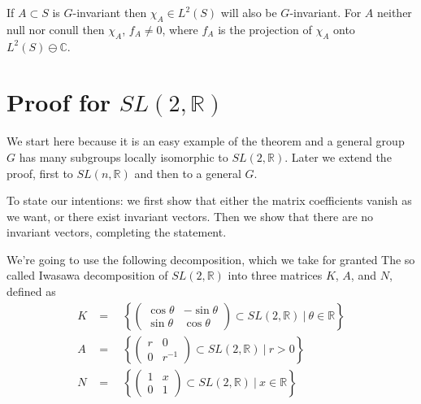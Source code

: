 \documentclass[
  12pt
]{article}
\theoremstyle{break}
\theoremstyle{plain}
\begin{document}
  If $A\subset S$ is $G$-invariant then $\chi_A\in L^2(S)$ will also
  be $G$-invariant. 
  For $A$ neither null nor conull then
  $\chi_A$, $f_A \neq 0$, where $f_A$ is the projection of
  $\chi_A$ onto $L^2(S) \ominus \mathbb{C}$.




\hypertarget{proof-for-sl2r}{%
\section{Proof for \texorpdfstring{$SL(2, \mathbb{R})$}{SL(2, R)}}\label{proof-for-sl2r}}


  We start here because it is an easy example of the theorem and a general
  group $G$ has many subgroups locally isomorphic to
  $SL(2, \mathbb{R})$. Later we extend the proof, first to
  $SL(n, \mathbb{R})$ and then to a general $G$.

  To state our intentions: we first show that either the matrix
  coefficients vanish as we want, or there exist invariant vectors. Then
  we show that there are no invariant vectors, completing the statement.

  We're going to use the following decomposition, which we take for
  granted 
  The so called Iwasawa decomposition of $SL(2, \mathbb{R})$ into three
  matrices $K$, $A$, and $N$, defined as
  \begin{align}
  K & =\quad \left\{ \begin{pmatrix} \cos\theta & -\sin\theta \\ \sin\theta & \cos\theta\end{pmatrix} \subset SL(2, \mathbb{R})  \ | \ \theta \in \mathbb{R} \right\} \\
  A & =\quad \left\{ \begin{pmatrix} r & 0 \\ 0 & r^{-1} \end{pmatrix} \subset SL(2, \mathbb{R})  \ | \ r > 0 \right\} \\
  N & =\quad \left\{ \begin{pmatrix} 1 & x \\ 0 & 1 \end{pmatrix} \subset SL(2, \mathbb{R})  \ | \ x \in \mathbb{R} \right\}\\
  \end{align}
\end{document}
